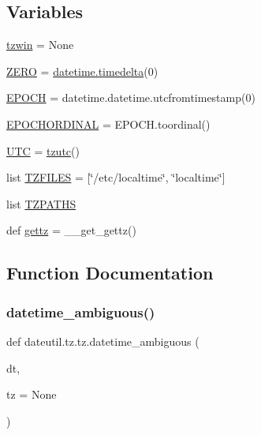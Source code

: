 \subsection*{Variables}
\begin{DoxyCompactItemize}
\item 
\hyperlink{namespacedateutil_1_1tz_1_1tz_ace91b67b861e0dac4377e44790fc2f75}{tzwin} = None
\item 
\hyperlink{namespacedateutil_1_1tz_1_1tz_a18378431357829ceeb09d65400bbc865}{Z\+E\+RO} = \hyperlink{noprefix_8h_ae6feacec25f59b525f6e0c442ef75ff7}{datetime.\+timedelta}(0)
\item 
\hyperlink{namespacedateutil_1_1tz_1_1tz_a7c010e6056d7ef2b13139b46f4876d17}{E\+P\+O\+CH} = datetime.\+datetime.\+utcfromtimestamp(0)
\item 
\hyperlink{namespacedateutil_1_1tz_1_1tz_a94222ee399001b3ceaa52a4e16af788d}{E\+P\+O\+C\+H\+O\+R\+D\+I\+N\+AL} = E\+P\+O\+C\+H.\+toordinal()
\item 
\hyperlink{namespacedateutil_1_1tz_1_1tz_ab991c64e6818646df618e99674cbdf41}{U\+TC} = \hyperlink{classdateutil_1_1tz_1_1tz_1_1tzutc}{tzutc}()
\item 
list \hyperlink{namespacedateutil_1_1tz_1_1tz_a9dc6bbef789deb84207009c08a339bbd}{T\+Z\+F\+I\+L\+ES} = \mbox{[}\char`\"{}/etc/localtime\char`\"{}, \char`\"{}localtime\char`\"{}\mbox{]}
\item 
list \hyperlink{namespacedateutil_1_1tz_1_1tz_a12ad37923e081992c88dea103b1c7610}{T\+Z\+P\+A\+T\+HS}
\item 
def \hyperlink{namespacedateutil_1_1tz_1_1tz_ad368d4e3cb04c5751ca8c7dfe1863c51}{gettz} = \+\_\+\+\_\+get\+\_\+gettz()
\end{DoxyCompactItemize}


\subsection{Function Documentation}
\mbox{\label{namespacedateutil_1_1tz_1_1tz_a6d25c2763c71b83d0f613b8e879ee9a9}} 
\subsubsection{\texorpdfstring{datetime\+\_\+ambiguous()}{datetime\_ambiguous()}}
{\footnotesize\ttfamily def dateutil.\+tz.\+tz.\+datetime\+\_\+ambiguous (\begin{DoxyParamCaption}\item[{}]{dt,  }\item[{}]{tz = {\ttfamily None} }\end{DoxyParamCaption})}

